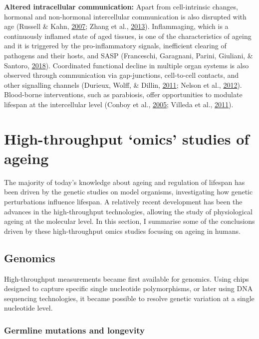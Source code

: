 \documentclass[12pt,twoside]{unicam}
\begin{document}
\textbf{Altered intracellular communication:} Apart from cell-intrinsic changes, hormonal and non-hormonal intercellular communication is also disrupted with age (Russell \& Kahn, \protect\hyperlink{ref-Russell2007}{2007}; Zhang et al., \protect\hyperlink{ref-Zhang2013}{2013}). Inflammaging, which is a continuously inflamed state of aged tissues, is one of the characteristics of ageing and it is triggered by the pro-inflammatory signals, inefficient clearing of pathogens and their hosts, and SASP (Franceschi, Garagnani, Parini, Giuliani, \& Santoro, \protect\hyperlink{ref-Franceschi2018}{2018}). Coordinated functional decline in multiple organ systems is also observed through communication via gap-junctions, cell-to-cell contacts, and other signalling channels (Durieux, Wolff, \& Dillin, \protect\hyperlink{ref-Durieux2011}{2011}; Nelson et al., \protect\hyperlink{ref-Nelson2012}{2012}). Blood-borne interventions, such as parabiosis, offer opportunities to modulate lifespan at the intercellular level (Conboy et al., \protect\hyperlink{ref-Conboy2005}{2005}; Villeda et al., \protect\hyperlink{ref-Villeda2011}{2011}).

\hypertarget{introOmics}{%
\section{High-throughput `omics' studies of ageing}\label{introOmics}}

The majority of today's knowledge about ageing and regulation of lifespan has been driven by the genetic studies on model organisms, investigating how genetic perturbations influence lifespan. A relatively recent development has been the advances in the high-throughput technologies, allowing the study of physiological ageing at the molecular level. In this section, I summarise some of the conclusions driven by these high-throughput omics studies focusing on ageing in humans.

\hypertarget{genomics}{%
\subsection{Genomics}\label{genomics}}

High-throughput measurements became first available for genomics. Using chips designed to capture specific single nucleotide polymorphisms, or later using DNA sequencing technologies, it became possible to resolve genetic variation at a single nucleotide level.

\hypertarget{germline-mutations-and-longevity}{%
\subsubsection{Germline mutations and longevity}\label{germline-mutations-and-longevity}}
\end{document}
